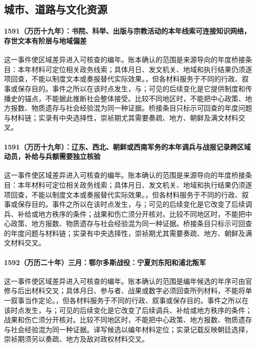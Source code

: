 \subsection{城市、道路与文化资源}

\paragraph{1591（万历十九年）：书院、科举、出版与宗教活动的本年线索可连接知识网络，存世文本有阶层与地域偏差} 这一事件使区域差异进入可核查的编年。账本确认的范围是来源导向的年度桥接条目：本年材料可定位相关政务线索；具体月日、发文机关、地域和执行结果仍须逐项回查，不能以制度文本或奏报替代实际效果。，但各材料服务于不同的行政、叙事或保存目的。事件之所以在该时点发生，与；可见的后续变化是它提供制度和传播史的锚点，不能据此推断社会整体接受。比较不同地区时，不能把中心政策、地方报数、物质遗存与社会经验混为同一种证据。桥接条目只标示可回查的年度问题与材料链；实录有中央选择性，崇祯期尤其需要奏疏、地方、朝鲜及满文材料交叉。

\paragraph{1591（万历十九年）：辽东、西北、朝鲜或西南军务的本年调兵与战报记录跨区域动员，补给与兵额需要独立核验} 这一事件使区域差异进入可核查的编年。账本确认的范围是来源导向的年度桥接条目：本年材料可定位相关政务线索；具体月日、发文机关、地域和执行结果仍须逐项回查，不能以制度文本或奏报替代实际效果。，但各材料服务于不同的行政、叙事或保存目的。事件之所以在该时点发生，与；可见的后续变化是它改变了后续调兵、补给或地方秩序的条件；战果和伤亡须分开核对。比较不同地区时，不能把中心政策、地方报数、物质遗存与社会经验混为同一种证据。桥接条目只标示可回查的年度问题与材料链；实录有中央选择性，崇祯期尤其需要奏疏、地方、朝鲜及满文材料交叉。

\paragraph{1592（万历二十年）三月：鄂尔多斯战役：宁夏刘东阳和浦北叛军} 这一事件使区域差异进入可核查的编年。账本确认的范围是编年候选的年序可由官修与后出材料交叉；具体月日、参与者、战果或数字必须回查所列材料，不能将单一叙事当作定论。，但各材料服务于不同的行政、叙事或保存目的。事件之所以在该时点发生，与；可见的后续变化是它改变了后续调兵、补给或地方秩序的条件；战果和伤亡须分开核对。比较不同地区时，不能把中心政策、地方报数、物质遗存与社会经验混为同一种证据。译写候选以编年材料定位；实录记载反映朝廷选择，崇祯期须另以奏疏、地方及敌对政权材料交叉。

